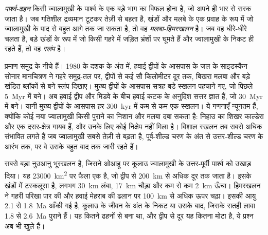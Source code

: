 \begin{definition}\label{def:b2:oceanic-islands:collapse}
\emph{पार्श्व-ढहन} किसी ज्वालामुखी के पार्श्व के एक बड़े भाग का विफल होना है,
जो अपने ही भार से सरक जाता है। जब गतिशील द्रव्यमान टूटकर तेज़ी से
बहता है, खंडों और मलबे के एक प्रवाह के रूप में जो ज्वालामुखी के पाद से बहुत आगे तक जा सकता है, तो वह
\emph{मलबा-हिमस्खलन} है। जब वह धीरे-धीरे चलता है, बड़े खंडों के रूप में जो किसी गहरे  में
जड़ित भ्रंशों पर घूमते हैं और ज्वालामुखी के निकट ही रहते हैं, तो वह \emph{स्लंप} है।
\end{definition}

प्रमाण समुद्र के नीचे हैं। 1980 के दशक के अंत में, हवाई द्वीपों के आसपास के जल के साइडस्कैन सोनार
मानचित्रण ने गहरे समुद्र-तल पर, द्वीपों से कई सौ किलोमीटर दूर तक, बिखरा मलबा
और बड़े खंडित ब्लॉकों से बने स्लंप दिखाए। मुख्य द्वीपों के आसपास सत्रह बड़े स्खलन पहचाने गए,
जो पिछले \qty{5}{Myr} में बने। अब हवाई द्वीप और मिडवे के बीच हवाई कटक के अनुदिश सत्तर ज्ञात हैं,
जो \qty{30}{Myr} में बने। यानी मुख्य द्वीपों के आसपास हर \qty{300}{kyr} में कम से कम
एक स्खलन। ये गणनाएँ न्यूनतम हैं, क्योंकि कोई नया ज्वालामुखी किसी पुराने का निशान और मलबा दबा सकता है:
निहाउ का शिखर काल्डेरा और एक दरार-क्षेत्र गायब हैं, और उनके लिए कोई निक्षेप नहीं मिला है। विशाल स्खलन तब
सबसे अधिक संभावित लगते हैं जब ज्वालामुखी सबसे तेज़ी से बढ़ता
है, पूर्व-शील्ड चरण के अंत से उत्तर-शील्ड चरण के आरंभ तक, पर वे
उसके बहुत बाद तक जारी रहते हैं।

सबसे बड़ा नुउआनु भूस्खलन है, जिसने ओआहू पर कूलाउ ज्वालामुखी के उत्तर-पूर्वी पार्श्व को
उखाड़ दिया। यह \qty{23000}{km^2} पर फैला एक  है, जो द्वीप से
\qty{200}{km} से अधिक दूर तक जाता है। इसके खंडों में टस्कलूसा  है, लगभग \qty{30}{km} लंबा,
\qty{17}{km} चौड़ा और कम से कम \qty{2}{km} ऊँचा। हिमस्खलन ने गहरी परिखा पार की और
हवाई मेहराब की ढलान पर \qty{100}{km} से अधिक ऊपर चढ़ा। इसकी आयु 2.1 से
\qty{1.8}{Ma} आँकी गई है, कूलाउ के जीवन के अंत के निकट या उसके बाद, जिसके सतही लावा 1.8 से
\qty{2.6}{Ma} पुराने हैं। यह कितने ढहनों से बना था, और द्वीप से दूर यह कितना मोटा है,
ये प्रश्न अब भी खुले हैं।

